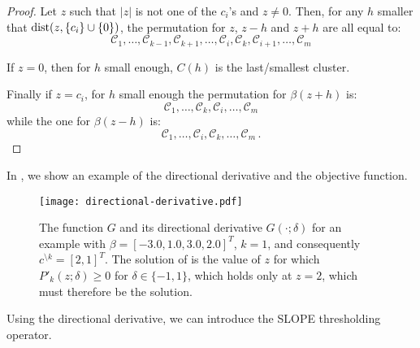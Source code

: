 \begin{proof}
  Let $z$ such that $|z|$ is not one of the $c_i$'s and $z \neq 0$.
  Then, for any $h$ smaller that $\operatorname{dist}(z, \{c_i\} \cup \{0\})$, the permutation for $z$, $z - h$ and $z + h$ are all equal to:
  \begin{equation*}
    \mathcal{C}_1, \dots, \mathcal{C}_{k-1}, \mathcal{C}_{k+1}, \dots, \mathcal{C}_i, \mathcal{C}_k, \mathcal{C}_{i+1}, \dots, \mathcal{C}_m
  \end{equation*}


  If $z = 0$, then for $h$ small enough, $C(h)$ is the last/smallest cluster.


  Finally if $z = c_i$, for $h$ small enough the permutation for $\beta(z + h)$ is:
  \begin{equation}
    \mathcal{C}_1, \dots, \mathcal{C}_k, \mathcal{C}_{i}, \dots, \mathcal{C}_m
  \end{equation}
  while the one for $\beta(z - h)$ is:
  \begin{equation}
    \mathcal{C}_1, \dots, \mathcal{C}_{i}, \mathcal{C}_k, \dots, \mathcal{C}_m \, .
  \end{equation}

\end{proof}

In , we show an example of the directional
derivative and the objective function.

\begin{figure}[htb]
  \centering
  \texttt{[image: directional-derivative.pdf]}
  \caption{%
  The function \(G\) and its directional derivative \(G( \cdot ; \delta)\) for
  an example with \(\beta = [-3.0, 1.0, 3.0, 2.0]^T\), \(k = 1\), and consequently
  \(c^{\setminus k} = [2, 1]^T\). The solution of  is the value of \(z\) for
      which \(P'_k(z; \delta) \geq 0 \) for \(\delta \in \{-1, 1\}\), which holds only
      at \(z = 2\), which must therefore be the solution.
    }
  \label{fig:directional-derivative}
\end{figure}

Using the directional derivative, we can introduce the SLOPE thresholding operator.

